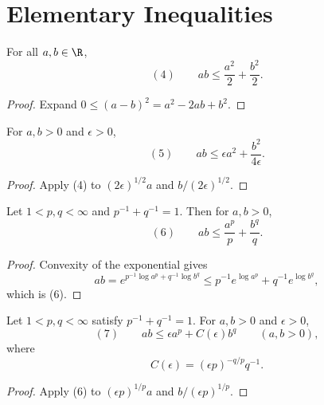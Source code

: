 \section{Elementary Inequalities}
\label{sec:elementary-inequalities}

\begin{lemma}
\label{lem:cauchys-inequality}
\leanok
{}
For all $a,b\in\R$,
\[
(4)\qquad ab\leq\frac{a^2}{2}+\frac{b^2}{2}.
\]
\end{lemma}
\begin{proof}
\sketch Expand $0\leq(a-b)^2=a^2-2ab+b^2$.
\end{proof}

\begin{lemma}
\label{lem:cauchys-inequality-epsilon}
\leanok
{}

For $a,b>0$ and $\epsilon>0$,
\[
(5)\qquad
ab\leq\epsilon a^2+\frac{b^2}{4\epsilon}.
\]
\end{lemma}
\begin{proof}
\sketch Apply (4) to $(2\epsilon)^{1/2}a$ and $b/(2\epsilon)^{1/2}$.
\end{proof}

\begin{lemma}
\label{lem:youngs-inequality}

Let $1<p,q<\infty$ and $p^{-1}+q^{-1}=1$. Then for $a,b>0$,
\[
(6)\qquad ab\leq\frac{a^p}{p}+\frac{b^q}{q}.
\]
\end{lemma}
\begin{proof}
\sketch Convexity of the exponential gives
\[
ab=e^{p^{-1}\log a^p+q^{-1}\log b^q}
\leq p^{-1}e^{\log a^p}+q^{-1}e^{\log b^q},
\]
which is (6).
\end{proof}

\begin{lemma}
\label{lem:youngs-inequality-epsilon}

Let $1<p,q<\infty$ satisfy $p^{-1}+q^{-1}=1$. For $a,b>0$ and $\epsilon>0$,
\[
(7)\qquad
ab\leq\epsilon a^p+C(\epsilon)b^q
\qquad(a,b>0),
\]
where
\[
C(\epsilon)=(\epsilon p)^{-q/p}q^{-1}.
\]
\end{lemma}
\begin{proof}
\sketch Apply (6) to $(\epsilon p)^{1/p}a$ and $b/(\epsilon p)^{1/p}$.
\end{proof}

